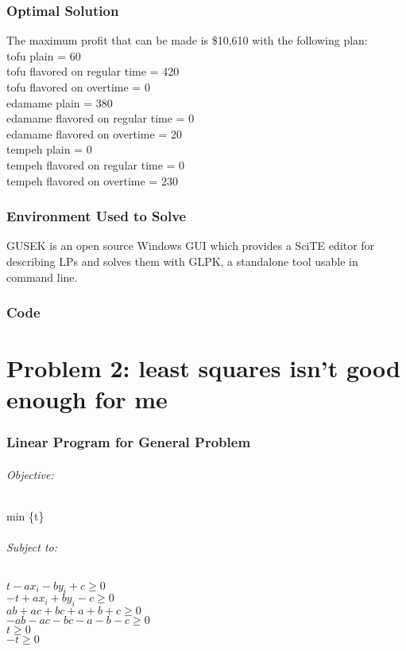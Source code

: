 \documentclass{article}
\begin{document}
\section*{Optimal Solution}
The maximum profit that can be made is \$10,610 with the following plan:\\
tofu plain = 60\\
tofu flavored on regular time = 420\\
tofu flavored on overtime = 0\\
edamame plain = 380\\
edamame flavored on regular time = 0\\
edamame flavored on overtime = 20\\
tempeh plain = 0\\
tempeh flavored on regular time = 0\\
tempeh flavored on overtime = 230\\

\section*{Environment Used to Solve}
GUSEK is an open source Windows GUI which provides a SciTE editor for describing LPs and solves them with GLPK, a standalone tool usable in command line.

\section*{Code}


\pagebreak


\part*{Problem 2: least squares isn't good enough for me}
\section*{Linear Program for General Problem}
\paragraph*{Objective:}
min \{t\}

\paragraph*{Subject to:\\}
$t - ax_i - by_i + c \geq 0$\\
$-t + ax_i + by_i - c \geq 0$\\
$ab + ac + bc + a + b + c \geq 0$\\
$-ab - ac - bc - a - b - c \geq 0$\\
$t \geq 0$\\
$-t \geq 0$\\
\end{document}
